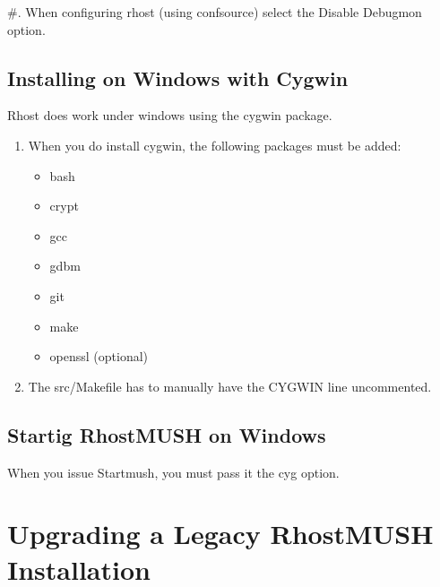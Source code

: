 \documentclass[letterpaper,10pt,english]{sphinxmanual}
\begin{document}
\sphinxAtStartPar
\#. When configuring rhost (using confsource) select the Disable Debugmon
option.


\section{Installing on Windows with Cygwin}
\label{\detokenize{windows:installing-on-windows-with-cygwin}}
\sphinxAtStartPar
Rhost does work under windows using the cygwin package.
\begin{enumerate}
%
\item {} 
\sphinxAtStartPar
When you do install cygwin, the following packages must be added:
\begin{itemize}
\item {} 
\sphinxAtStartPar
bash

\item {} 
\sphinxAtStartPar
crypt

\item {} 
\sphinxAtStartPar
gcc

\item {} 
\sphinxAtStartPar
gdbm

\item {} 
\sphinxAtStartPar
git

\item {} 
\sphinxAtStartPar
make

\item {} 
\sphinxAtStartPar
openssl (optional)

\end{itemize}

\item {} 
\sphinxAtStartPar
The src/Makefile has to manually have the CYGWIN line uncommented.

\end{enumerate}


\section{Startig RhostMUSH on Windows}
\label{\detokenize{windows:startig-rhostmush-on-windows}}
\sphinxAtStartPar
When you issue Startmush, you must pass it the \sphinxhyphen{}cyg option.


\chapter{Upgrading a Legacy RhostMUSH Installation}
\label{\detokenize{legacy:upgrading-a-legacy-rhostmush-installation}}\label{\detokenize{legacy::doc}}
\end{document}

